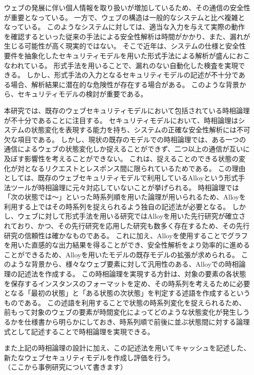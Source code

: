 \documentclass[12pt,a4paper]{jbook}
\begin{document}
ウェブの発展に伴い個人情報を取り扱いが増加しているため、その通信の安全性が重要となっている。
一方で、ウェブの構造は一般的なシステムと比べ複雑となっている。
このようなシステムに対しては、適当な入力を与えて実際の動作を確認するといった従来の手法による安全性解析は時間がかかり、また、漏れが生じる可能性が高く現実的ではない。
そこで近年は、システムの仕様と安全性要件を抽象化したセキュリティモデルを用いた形式手法による解析が盛んにおこなわれている。
形式手法を用いることで、漏れのない自動化した検査を実現できる。
しかし、形式手法の入力となるセキュリティモデルの記述が不十分である場合、解析結果に潜在的な危険性が存在する場合がある。
このような背景から、セキュリティモデルの検討が重要である。

本研究では、既存のウェブセキュリティモデルにおいて包括されている時相論理が不十分であることに注目する。
セキュリティモデルにおいて、時相論理はシステムの状態変化を表現する能力を持ち、システムの正確な安全性解析には不可欠な項目である。
しかし、現状の既存のモデルでの時相論理では、ある一つの通信によるウェブの状態変化しか捉えることができず、二つ以上の通信が互いに及ぼす影響性を考えることができない。
これは、捉えることのできる状態の変化が対となるリクエストとレスポンス間に限られているためである。
この理由としては、既存のウェブセキュリティモデルで利用しているAlloyという形式手法ツールが時相論理に元々対応していないことが挙げられる。
時相論理では「次の状態では～」といった時系列順を用いた論理が用いられるため、Alloyを利用する上ではその時系列を捉えられるよう独自の記述法が必要となる。
\color{red}
しかし、ウェブに対して形式手法を用いる研究ではAlloyを用いた先行研究が確立されており、かつ、その先行研究を応用した研究も数多く存在するため、その先行研究の信頼性は確かなものである。
これに加え、Alloyを使用することでグラフを用いた直感的な出力結果を得ることができ、安全性解析をより効率的に進めることができるため、Alloyを用いたモデルの既存モデルの拡張が求められる。
\color{black}
このような背景から、様々なウェブ要素に対して汎用性のある、Alloyでの時相論理の記述法を作成する。
この時相論理を実現する方針は、対象の要素の各状態を保存するインスタンスのフォーマットを定め、その時系列を考えるために必要となる「最初の状態」と「ある状態の次状態」を判定する述語を作成するというものである。
この述語を利用することで状態の時系列変化を捉えられるため、前もって対象のウェブの要素が時間変化によってどのような状態変化が発生しうるかを仕様書から明らかにしておき、時系列順で前後に並ぶ状態間に対する論理式として記述することで時相論理を実現できる。

また上記の時相論理の設計に加え、この記述法を用いてキャッシュを記述した、新たなウェブセキュリティモデルを作成し評価を行う。
\\（ここから事例研究について書きます）
\end{document}
